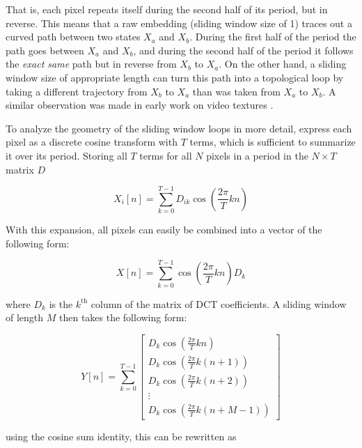 \documentclass[a4paper,UKenglish]{lipics}
\begin{document}
That is, each pixel repeats itself during the second half of its period, but in reverse.  This means that a raw embedding (sliding window size of 1) traces out a curved path between two states $X_a$ and $X_b$.  During the first half of the period the path goes between $X_a$ and $X_b$, and during the second half of the period it follows the {\em exact same} path but in reverse from $X_b$ to $X_a$.  On the other hand, a sliding window size of appropriate length can turn this path into a topological loop by taking a different trajectory from $X_b$ to $X_a$ than was taken from $X_a$ to $X_b$.  A similar observation was made in early work on video textures \cite{schodl2000video}.

To analyze the geometry of the sliding window loops in more detail, express each pixel as a discrete cosine transform with $T$ terms, which is sufficient to summarize it over its period.  Storing all $T$ terms for all $N$ pixels in a period in the $N \times T$ matrix $D$

\begin{equation}
X_i[n] = \sum_{k = 0}^{T-1} D_{ik} \cos \left( \frac{2 \pi}{T} k n  \right)
\end{equation}

With this expansion, all pixels can easily be combined into a vector of the following form:

\begin{equation}
\label{eq:rawexpansion}
X[n] = \sum_{k = 0}^{T-1} \cos \left( \frac{2 \pi}{T} k n \right) D_k
\end{equation}

where $D_k$ is the $k^{\text{th}}$ column of the matrix of DCT coefficients.  A sliding window of length $M$ then takes the following form:

\begin{equation}
Y[n] = \sum_{k = 0}^{T-1} \left[ \begin{array}{c} D_k \cos \left( \frac{2 \pi}{T} k n \right)  \\ D_k \cos \left( \frac{2 \pi}{T} k (n+1) \right) \\ D_k \cos \left( \frac{2 \pi}{T} k (n+2) \right) \\  \vdots \\ D_k \cos \left( \frac{2 \pi}{T} k (n+M-1) \right) \end{array} \right] 
\end{equation}


using the cosine sum identity, this can be rewritten as
\end{document}
